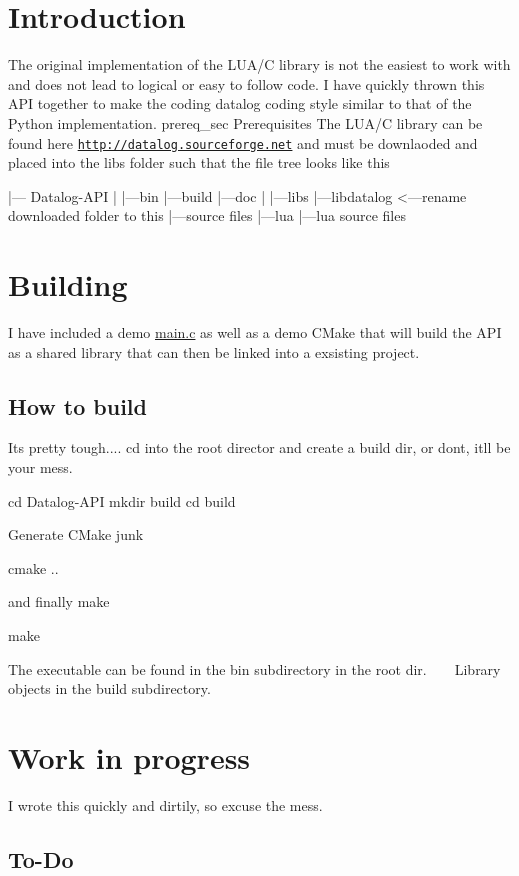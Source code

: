 \hypertarget{index_intro_sec}{}\section{Introduction}\label{index_intro_sec}
The original implementation of the L\+U\+A/C library is not the easiest to work with and does not lead to logical or easy to follow code. I have quickly thrown this A\+PI together to make the coding datalog coding style similar to that of the Python implementation.  prereq\+\_\+sec Prerequisites The L\+U\+A/C library can be found here \href{http://datalog.sourceforge.net}{\tt http\+://datalog.\+sourceforge.\+net} and must be downlaoded and placed into the libs folder such that the file tree looks like this ~\newline
~\newline
 \begin{DoxyVerb}  |--- Datalog-API 
        | 
        |---bin
        |---build
        |---doc
        |
        |---libs
             |---libdatalog <---rename downloaded folder to this
                 |---source files
                 |---lua
                      |---lua source files
\end{DoxyVerb}
 \hypertarget{index_building_sec}{}\section{Building}\label{index_building_sec}
I have included a demo \hyperlink{main_8c}{main.\+c} as well as a demo C\+Make that will build the A\+PI as a shared library that can then be linked into a exsisting project.~\newline
 \hypertarget{index_build_cmds}{}\subsection{How to build}\label{index_build_cmds}
It\textquotesingle{}s pretty tough.... cd into the root director and create a build dir, or don\textquotesingle{}t, it\textquotesingle{}ll be your mess. \begin{DoxyVerb} cd Datalog-API
 mkdir build
 cd build\end{DoxyVerb}
 Generate C\+Make junk \begin{DoxyVerb} cmake ..\end{DoxyVerb}
 and finally make \begin{DoxyVerb} make\end{DoxyVerb}
 The executable can be found in the bin subdirectory in the root dir. ~\newline
~\newline
 Library objects in the build subdirectory. \hypertarget{index_progress_sec}{}\section{Work in progress}\label{index_progress_sec}
I wrote this quickly and dirtily, so excuse the mess. \hypertarget{index_todo_sec}{}\subsection{To-\/\+Do}\label{index_todo_sec}

